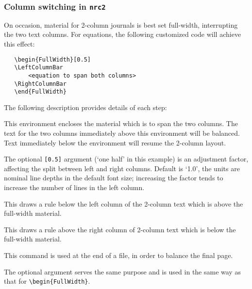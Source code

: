\subsubsection{Column switching in \texttt{nrc2}}

On occasion, material for 2-column journals is best set full-width,
interrupting the two text columns. For equations, the following
customized code will achieve this effect:

\begin{verbatim}
   \begin{FullWidth}[0.5]
   \LeftColumnBar
       <equation to span both columns>
   \RightColumnBar
   \end{FullWidth}
\end{verbatim}

The following description provides details of each step:

\begin{description} \itemsep=0pt
   \item [{\tt \blash begin\char`\{FullWidth\char`\}\ ... \blash
         end\char`\{FullWidth\char`\}}]

         This environment encloses the material which is to span the
         two columns. The text for the two columns immediately above
         this environment will be balanced. Text immediately below
         the environment will resume the 2-column layout. 

         The optional \texttt{[0.5]} argument (`one half' in this
         example) is an adjustment factor, affecting the split between
         left and right columns. Default is `1.0', the units are
         nominal line depths in the default font size; increasing the
         factor tends to increase the number of lines in the left
         column.

   \item  [{\tt \blash LeftColumnBar}] \mbox{}

          This draws a rule below the left column of the 2-column text
          which is above the full-width material. 

   \item  [{\tt \blash RightColumnBar}] \mbox{}

          This draws a rule above the right column of 2-column text
          which is below the full-width material.

   \item  [{\tt \blash BalanceColumns[0.5]}] \mbox{}

          This command is used at the end of a file, in order to
          balance the final page. 

          The optional argument serves the same purpose and is used
          in the same way as that for \verb|\begin{FullWidth}|.
\end{description}


